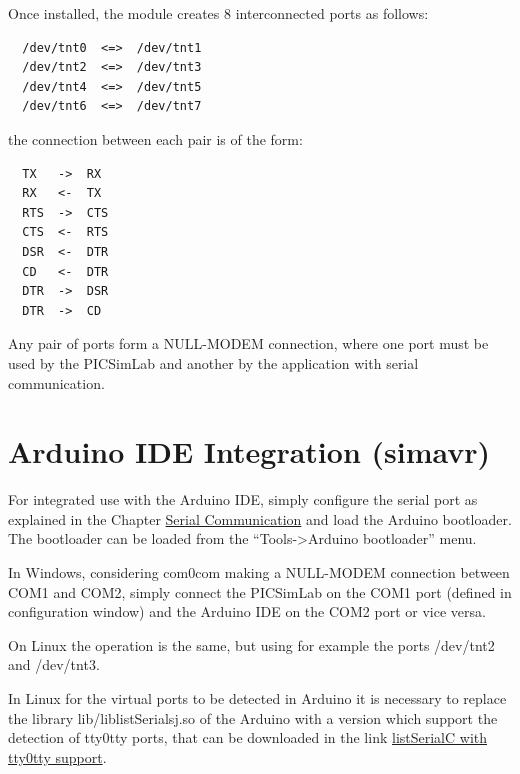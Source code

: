 Once installed, the module creates 8 interconnected ports as follows:
\begin{verbatim}
  /dev/tnt0  <=>  /dev/tnt1 
  /dev/tnt2  <=>  /dev/tnt3 
  /dev/tnt4  <=>  /dev/tnt5 
  /dev/tnt6  <=>  /dev/tnt7 
\end{verbatim}

the connection between each pair is of the form:
\begin{verbatim}  
  TX   ->  RX
  RX   <-  TX 	
  RTS  ->  CTS
  CTS  <-  RTS
  DSR  <-  DTR
  CD   <-  DTR
  DTR  ->  DSR
  DTR  ->  CD
\end{verbatim}

Any pair of ports form a NULL-MODEM connection, where one port must be used by the PICSimLab and another by the application with serial communication.


\section{Arduino IDE Integration (simavr) } \hypertarget{def:arduinoide}{}

For integrated use with the Arduino IDE, simply configure the serial port as explained in the Chapter \hyperlink{def:seriali}{Serial Communication} and load the Arduino bootloader. The bootloader can be loaded from the ``Tools->Arduino bootloader'' menu.

In Windows, considering com0com making a NULL-MODEM connection between COM1 and COM2, simply connect the PICSimLab on the COM1 port (defined in configuration window) and the Arduino IDE on the COM2 port or vice versa.

On Linux the operation is the same, but using for example the ports /dev/tnt2 and /dev/tnt3.

In Linux for the virtual ports to be detected in Arduino it is necessary to replace the library lib/liblistSerialsj.so of the Arduino with a version which support the detection of tty0tty ports, that can be downloaded in the link \href{https://github.com/lcgamboa/listSerialPortsC/releases} {listSerialC with tty0tty support}.

